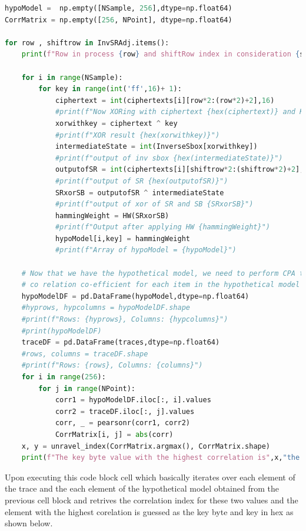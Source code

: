\documentclass[12pt, letterpaper, oneside]{report}
\begin{document}
\newpage 
\begin{lstlisting}[language=Python, caption=Code Block for divide and conquer ]
hypoModel =  np.empty([NSample, 256],dtype=np.float64)
CorrMatrix = np.empty([256, NPoint], dtype=np.float64)

for row , shiftrow in InvSRAdj.items():
    print(f"Row in process {row} and shiftRow index in consideration {shiftrow}")

    for i in range(NSample):
        for key in range(int('ff',16)+ 1):
            ciphertext = int(ciphertexts[i][row*2:(row*2)+2],16)
            #print(f"Now XORing with ciphertext {hex(ciphertext)} and Key {key}")
            xorwithkey = ciphertext ^ key
            #print(f"XOR result {hex(xorwithkey)}")
            intermediateState = int(InverseSbox[xorwithkey])
            #print(f"output of inv sbox {hex(intermediateState)}")
            outputofSR = int(ciphertexts[i][shiftrow*2:(shiftrow*2)+2],16)
            #print(f"output of SR {hex(outputofSR)}")
            SRxorSB = outputofSR ^ intermediateState
            #print(f"output of xor of SR and SB {SRxorSB}")
            hammingWeight = HW(SRxorSB)
            #print(f"Output after applying HW {hammingWeight}")
            hypoModel[i,key] = hammingWeight
            #print(f"Array of hypoModel = {hypoModel}")

    # Now that we have the hypothetical model, we need to perform CPA that means we have to find
    # co relation co-efficient for each item in the hypothetical model and actual power trace.
    hypoModelDF = pd.DataFrame(hypoModel,dtype=np.float64)
    #hyprows, hypcolumns = hypoModelDF.shape
    #print(f"Rows: {hyprows}, Columns: {hypcolumns}")
    #print(hypoModelDF)
    traceDF = pd.DataFrame(traces,dtype=np.float64)
    #rows, columns = traceDF.shape
    #print(f"Rows: {rows}, Columns: {columns}")
    for i in range(256):
        for j in range(NPoint):
            corr1 = hypoModelDF.iloc[:, i].values
            corr2 = traceDF.iloc[:, j].values
            corr, _ = pearsonr(corr1, corr2)
            CorrMatrix[i, j] = abs(corr)       
    x, y = unravel_index(CorrMatrix.argmax(), CorrMatrix.shape)
    print(f"The key byte value with the highest correlation is",x,"the key byte value in hex is ",hex(x))
\end{lstlisting}
\newpage 
Upon executing this code block cell which basically iterates over each element of the trace and the each element of the hypothetical model obtained from the previous cell block and retrives the correlation index for these two values and the element with the highest corelation is guessed as the key byte and key in hex as shown below.
\end{document}
